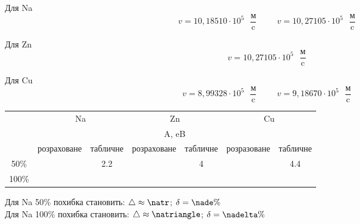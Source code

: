 \documentclass[a4paper,14pt]{extreport}
\begin{document}
	Для Na
		$$v =  10,18510\cdot 10^{5} \text{ }\dfrac{\text{м}}{\text{c}} \hspace{1cm}v = 10,27105\cdot 10^{5}  \text{ }\dfrac{\text{м}}{\text{c}}$$
	
	Для Zn
		$$v = 10,27105\cdot 10^{5}  \text{ }\dfrac{\text{м}}{\text{c}} $$
	

	Для Cu
		$$v = 8,99328\cdot 10^{5} \text{ }\dfrac{\text{м}}{\text{c}} \hspace{1cm} v =9,18670\cdot 10^{5}  \text{ }\dfrac{\text{м}}{\text{c}}$$
	\clearpage 
	\newpage
	


\begin{table}[h]
	\begin{center}
		\begin{small}
			\begin{tabular}{|l|c|c|c|c|c|c|}
			\hline
			\multirow{3}{*}{} & \multicolumn{2}{c|}{Na} & \multicolumn{2}{c|}{Zn} & \multicolumn{2}{c|}{Cu} \\ \cline{2-7} 
			 & \multicolumn{6}{c|}{A, eB} \\ \cline{2-7} 
			 & розраховане & табличне & розраховане & табличне & розразоване & табличне \\ \hline
			\multicolumn{1}{|c|}{50\%} & \na & \multirow{2}{*}{2.2} & \zn & \multirow{2}{*}{4} & \cu & \multirow{2}{*}{4.4} \\ \cline{1-2} \cline{4-4} \cline{6-6}
			\multicolumn{1}{|c|}{100\%} & \naa &  & \zn &  & \cuu &  \\ \hline
			\end{tabular}
		\end{small}
	\end{center}
\end{table}

\FPeval{}
\FPeval{}
\FPeval{}
\FPeval{}

\FPeval{}
\FPeval{}

\FPeval{}
\FPeval{}
\FPeval{}
\FPeval{}




	Для Na 50\% похибка становить: $\triangle \approx \natr$; 
	$\delta = 	\nade \%$\\
	Для Na 100\% похибка становить: $\triangle \approx \natriangle$; 
	$\delta = \nadelta\%$\\
\end{document}
